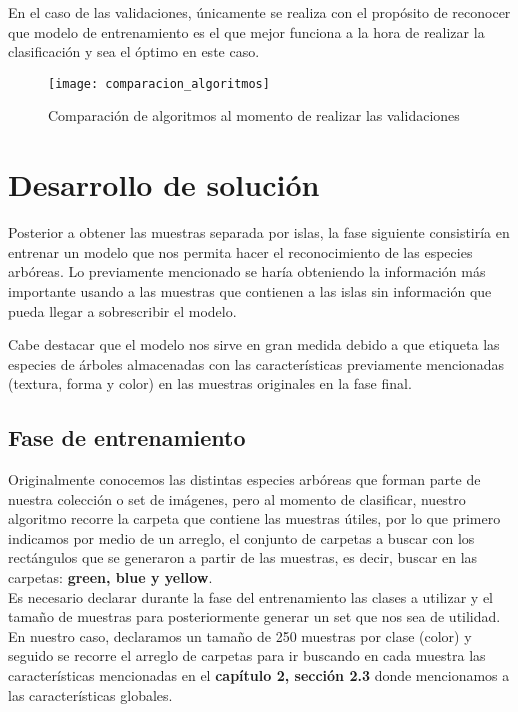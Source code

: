 En el caso de las validaciones, únicamente se realiza con el propósito de reconocer que modelo de entrenamiento es el que mejor funciona a la hora de realizar la clasificación y sea el óptimo en este caso. \\


\begin{figure}[h]
 \centering
\texttt{[image: comparacion\_algoritmos]}
\caption[Comparación de algoritmos]{Comparación de algoritmos al momento de realizar las validaciones}
\end{figure}

\break

\chapter{Desarrollo de solución}

Posterior a obtener las muestras separada por islas, la fase siguiente consistiría en entrenar un modelo que nos permita hacer el reconocimiento de las especies arbóreas. Lo previamente mencionado se haría obteniendo la información más importante usando a las muestras que contienen a las islas sin información que pueda llegar a sobrescribir el modelo.

Cabe destacar que el modelo nos sirve en gran medida debido a que etiqueta las especies de árboles almacenadas con las características previamente mencionadas (textura, forma y color) en las muestras originales en la fase final.

\section{Fase de entrenamiento}
Originalmente conocemos las distintas especies arbóreas que forman parte de nuestra colección o set de imágenes, pero al momento de clasificar, nuestro algoritmo recorre la carpeta que contiene las muestras útiles, por lo que primero indicamos por medio de un arreglo, el conjunto de carpetas a buscar con los rectángulos que se generaron a partir de las muestras, es decir, buscar en las carpetas: \textbf{green, blue y yellow}. \\

Es necesario declarar durante la fase del entrenamiento las clases a utilizar y el tamaño de muestras para posteriormente generar un set que nos sea de utilidad. En nuestro caso, declaramos un tamaño de 250 muestras por clase (color) y seguido se recorre el arreglo de carpetas para ir buscando en cada muestra las características mencionadas en el \textbf{capítulo 2, sección 2.3} donde mencionamos a las características globales.

